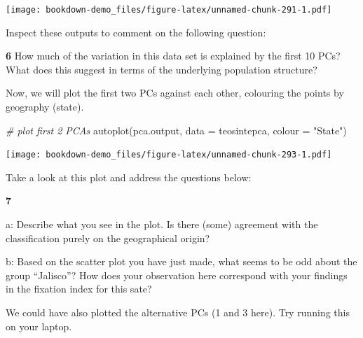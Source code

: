 \documentclass[
]{book}
\makeatletter
\newenvironment{Shaded}{\begin{snugshade}}{\end{snugshade}}
\newcommand{\AttributeTok}[1]{\textcolor[rgb]{0.77,0.63,0.00}{#1}}
\newcommand{\CommentTok}[1]{\textcolor[rgb]{0.56,0.35,0.01}{\textit{#1}}}
\newcommand{\FunctionTok}[1]{\textcolor[rgb]{0.00,0.00,0.00}{#1}}
\newcommand{\NormalTok}[1]{#1}
\newcommand{\StringTok}[1]{\textcolor[rgb]{0.31,0.60,0.02}{#1}}
\newenvironment{kframe}{%
\medskip{}
\setlength{\fboxsep}{.8em}
 \def\at@end@of@kframe{}%
 \ifinner\ifhmode%
  \def\at@end@of@kframe{\end{minipage}}%
  \begin{minipage}{\columnwidth}%
 \fi\fi%
 \def\FrameCommand##1{\hskip\@totalleftmargin \hskip-\fboxsep
 \colorbox{shadecolor}{##1}\hskip-\fboxsep
     \hskip-\linewidth \hskip-\@totalleftmargin \hskip\columnwidth}%
 \MakeFramed {\advance\hsize-\width
   \@totalleftmargin\z@ \linewidth\hsize
   \@setminipage}}%
 {\par\unskip\endMakeFramed%
 \at@end@of@kframe}
\newenvironment{rmdblock}[1]
  {
  \begin{itemize}
  \renewcommand{\labelitemi}{
    \raisebox{-.7\height}[0pt][0pt]{
      {\setkeys{Gin}{width=3em,keepaspectratio}\texttt{[image: images/\#1]}}
    }
  }
  \setlength{\fboxsep}{1em}
  \begin{kframe}
  \item
  }
  {
  \end{kframe}
  \end{itemize}
  }
\newenvironment{rmdquiz}
  {\begin{rmdblock}{quiz}}
  {\end{rmdblock}}
\makeatother
\begin{document}
\texttt{[image: bookdown-demo\_files/figure-latex/unnamed-chunk-291-1.pdf]}

Inspect these outputs to comment on the following question:

\begin{rmdquiz}
\textbf{6} How much of the variation in this data set is explained by the first 10 PCs? What does this suggest in terms of the underlying population structure?
\end{rmdquiz}

Now, we will plot the first two PCs against each other, colouring the points by geography (state).

\begin{Shaded}
\begin{Highlighting}[]
\CommentTok{\# plot first 2 PCAs}
\FunctionTok{autoplot}\NormalTok{(pca.output, }\AttributeTok{data =}\NormalTok{ teosintepca, }\AttributeTok{colour =} \StringTok{"State"}\NormalTok{)}
\end{Highlighting}
\end{Shaded}

\texttt{[image: bookdown-demo\_files/figure-latex/unnamed-chunk-293-1.pdf]}

Take a look at this plot and address the questions below:

\begin{rmdquiz}
\textbf{7}

a: Describe what you see in the plot. Is there (some) agreement with the classification purely on the geographical origin?

b: Based on the scatter plot you have just made, what seems to be odd about the group ``Jalisco''? How does your observation here correspond with your findings in the fixation index for this sate?
\end{rmdquiz}

We could have also plotted the alternative PCs (1 and 3 here). Try running this on your laptop.
\end{document}
